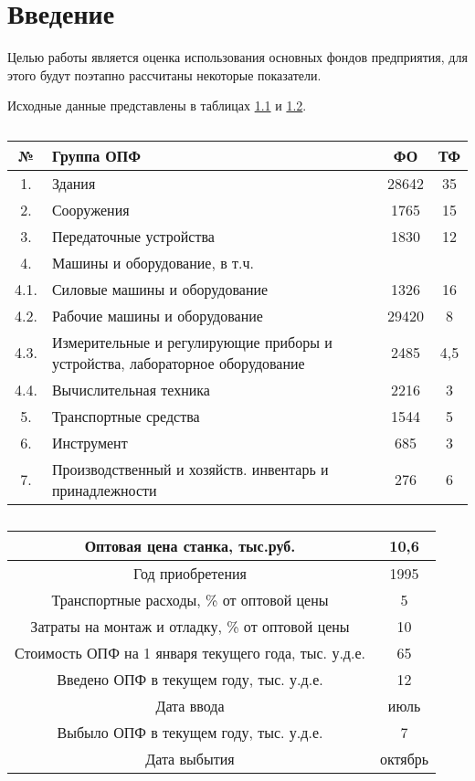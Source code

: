 \chapter{Введение}

Целью работы является оценка использования основных фондов предприятия, для этого будут поэтапно рассчитаны некоторые показатели.

Исходные данные представлены в таблицах \ref{tbl:initial} и \ref{tbl:indicators}.

\begin{table}
	\caption{}
	\label{tbl:initial}
	\centering
	
	\begin{tabular}{|c|p{10cm}|c|c|}
		\hline
№ & Группа ОПФ & ФО & ТФ \\ \hline		
1.  &  Здания & 28642 & 35 \\ \hline
2.  &  Сооружения & 1765 & 15 \\ \hline
3.  &  Передаточные устройства & 1830 & 12 \\ \hline
4.  &  Машины и оборудование,   в  т.ч. &  &  \\ \hline
4.1. &     Силовые машины и оборудование & 1326 & 16 \\ \hline
4.2. &     Рабочие  машины и оборудование & 29420 & 8 \\ \hline
4.3. &     Измерительные и регулирующие приборы и устройства, лабораторное оборудование & 2485 & 4,5 \\ \hline
4.4. &     Вычислительная техника & 2216 & 3 \\ \hline
5.  &  Транспортные средства & 1544 & 5 \\ \hline
6.  &  Инструмент & 685 & 3 \\ \hline
7.  &  Производственный и хозяйств. инвентарь и принадлежности & 276 & 6 \\ \hline
	\end{tabular}
\end{table}

\begin{table}
	\caption{}
	\label{tbl:indicators}
	\centering
	\begin{tabular}{|c|c|}
		\hline
		Оптовая цена станка, тыс.руб. & 10,6 \\ \hline
		Год приобретения & 1995 \\ \hline
		Транспортные расходы, \% от оптовой цены & 5 \\ \hline
		Затраты на монтаж и отладку, \% от оптовой цены & 10 \\ \hline
		Стоимость ОПФ на 1 января текущего года, тыс. у.д.е. & 65 \\ \hline
		Введено ОПФ в текущем году,  тыс. у.д.е. & 12 \\ \hline
		Дата ввода & июль \\ \hline
		Выбыло ОПФ в текущем году,  тыс. у.д.е. & 7 \\ \hline
		Дата выбытия & октябрь \\ \hline
	\end{tabular}

\end{table}

